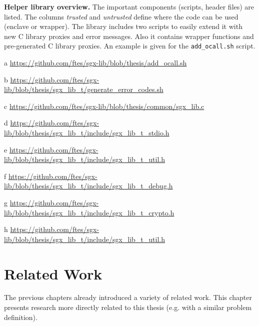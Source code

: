 \begin{table}
\centering
\begin{threeparttable}

\caption{
\textbf{Helper library overview.}\label{ID_512336551}
The important components (scripts, header files) are listed.\label{ID_1453990158}
The columns \textit{trusted} and \textit{untrusted} define where the code can be used (enclave or wrapper).\label{ID_1729911226}
The library includes two scripts to easily extend it with new C library proxies and error messages.\label{ID_1217070545}
Also it contains wrapper functions and pre-generated C library proxies.\label{ID_303785643}
An example is given for the \texttt{add\_{}ocall.sh} script.\label{ID_548058171}
}
\label{table:sgx-lib}\label{ID_657393313}
\begin{tablenotes}\label{ID_1372013698}
\item[a] \url{https://github.com/ftes/sgx-lib/blob/thesis/add_ocall.sh}\label{ID_962465848}
\item[b] \url{https://github.com/ftes/sgx-lib/blob/thesis/sgx_lib_t/generate_error_codes.sh}\label{ID_404031672}
\item[c] \url{https://github.com/ftes/sgx-lib/blob/thesis/common/sgx_lib.c}\label{ID_1959410779}
\item[d] \url{https://github.com/ftes/sgx-lib/blob/thesis/sgx_lib_t/include/sgx_lib_t_stdio.h}\label{ID_1093492253}
\item[e] \url{https://github.com/ftes/sgx-lib/blob/thesis/sgx_lib_t/include/sgx_lib_t_util.h}\label{ID_964206080}
\item[f] \url{https://github.com/ftes/sgx-lib/blob/thesis/sgx_lib_t/include/sgx_lib_t_debug.h}\label{ID_222739698}
\item[g] \url{https://github.com/ftes/sgx-lib/blob/thesis/sgx_lib_t/include/sgx_lib_t_crypto.h}\label{ID_540478273}
\item[h] \url{https://github.com/ftes/sgx-lib/blob/thesis/sgx_lib_t/include/sgx_lib_t_util.h}\label{ID_322028450}
\end{tablenotes}\label{ID_1182408768}
\end{threeparttable}
\end{table}

\chapter{Related Work\label{ID_123293925}\label{chapter:related-work}}
The previous chapters already introduced a variety of related work.\label{ID_555387243}
This chapter presents research more directly related to this thesis (e.g. with a similar problem definition).\label{ID_883710146}

